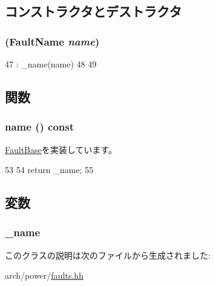 \subsection{コンストラクタとデストラクタ}
\hypertarget{classPowerISA_1_1PowerFault_a8a353517c99bcdf649163417bfaa3288}{
\subsubsection[{PowerFault}]{ ({\bf FaultName} {\em name})}}
\label{classPowerISA_1_1PowerFault_a8a353517c99bcdf649163417bfaa3288}



\begin{DoxyCode}
47         : _name(name)
48     {
49     }
\end{DoxyCode}


\subsection{関数}
\hypertarget{classPowerISA_1_1PowerFault_a73adb23259baf912a81683a9790a303f}{
\subsubsection[{name}]{ name () const}}
\label{classPowerISA_1_1PowerFault_a73adb23259baf912a81683a9790a303f}


\hyperlink{classFaultBase_aad960357563b8b969d2dffdcc6861de7}{FaultBase}を実装しています。


\begin{DoxyCode}
53     {
54         return _name;
55     }
\end{DoxyCode}


\subsection{変数}
\hypertarget{classPowerISA_1_1PowerFault_ac79073ffcd2c66a09bcd3bd3ad206019}{
\subsubsection[{\_\-name}]{ {\bf \_\-name}}}
\label{classPowerISA_1_1PowerFault_ac79073ffcd2c66a09bcd3bd3ad206019}


このクラスの説明は次のファイルから生成されました:\begin{DoxyCompactItemize}
\item 
arch/power/\hyperlink{arch_2power_2faults_8hh}{faults.hh}\end{DoxyCompactItemize}
